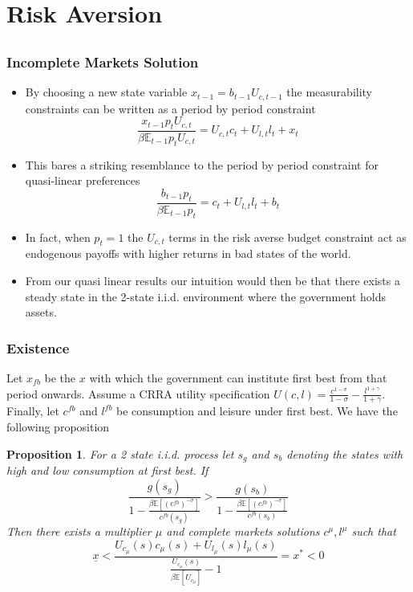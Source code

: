 \documentclass{beamer}
\newcommand{\EE}{\mathbb E}
\newtheorem{proposition}{Proposition}
\begin{document}
\section{Risk Aversion}
\subsection{}

 \begin{frame}
 	\frametitle{Incomplete Markets Solution}
	\begin{itemize}
	\item By choosing a new state variable $x_{t-1} = b_{t-1} U_{c,t-1}$ the measurability constraints can be written as a period by period constraint
	\[
		\frac{x_{t-1} p_t U_{c,t}}{\beta \EE_{t-1} p_t U_{c,t}}  = U_{c,t}c_t+U_{l,t} l_t + x_t
	\]
	\item  This bares a striking resemblance to the period by period constraint for quasi-linear preferences
	\[
		\frac{b_{t-1} p_t}{\beta \EE_{t-1} p_t} = c_t + U_{l,t} l_t + b_t
	\]
	\item  In fact, when $p_t =1$ the $U_{c,t}$ terms in the risk averse budget constraint act as endogenous payoffs with higher returns in bad states of the world.
	\item  From our quasi linear results our intuition would then be that there exists a steady state in the 2-state i.i.d. environment where the government holds assets.
	\end{itemize}
\end{frame}

\begin{frame}
	\frametitle{Existence}
	Let $x_{fb}$ be the $x$ with which the government can institute first best from that period onwards.  Assume a CRRA utility specification $U(c,l) = \frac{c^{1-\sigma}}{1-\sigma} -\frac{ l^{1+\gamma}}{1+\gamma}$.  Finally, let  $c^{fb}$ and $l^{fb}$ be consumption and leisure under first best.  We have the following proposition
	\begin{proposition}  For a 2 state i.i.d. process let  $s_g$ and $s_b$ denoting the states with high and low consumption at first best.  If
	\[
		\frac{g(s_g)}{1-\frac{\beta\EE[(c^{fb})^{-\sigma}]}{c^{fb}(s_g)}} > \frac{g(s_b)}{1-\frac{\beta\EE[(c^{fb})^{-\sigma}]}{c^{fb}(s_b)}}
	\]  Then there exists a multiplier $\mu$ and complete markets solutions $c^\mu,l^\mu$ such that 
	\[
	\underline x<\frac{U_{c_\mu}(s)c_\mu(s) + U_{l_\mu}(s) l_\mu(s)}{\frac{U_{c_\mu}(s)}{\beta\EE[U_{c_\mu}]}-1} = x^* <0
	\]
	\end{proposition} 
\end{frame}
\end{document}
